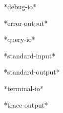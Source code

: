\begin{variable}{*debug-io*}{}{}{}
  
\end{variable}

\begin{variable}{*error-output*}{}{}{}
  
\end{variable}

\begin{variable}{*query-io*}{}{}{}
  
\end{variable}

\begin{variable}{*standard-input*}{}{}{}
  
\end{variable}

\begin{variable}{*standard-output*}{}{}{}
  
\end{variable}

\begin{variable}{*terminal-io*}{}{}{}
  
\end{variable}

\begin{variable}{*trace-output*}{}{}{}
  
\end{variable}
